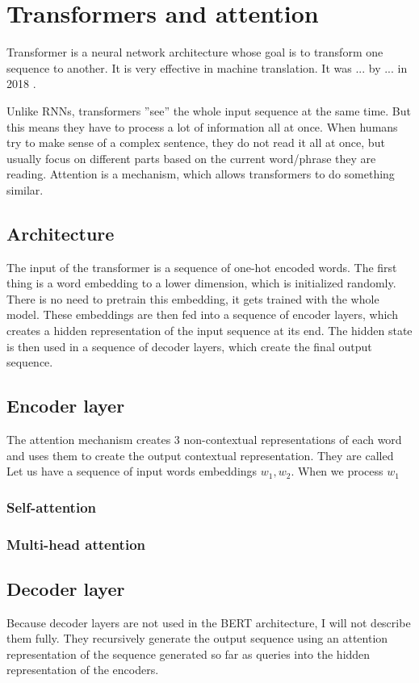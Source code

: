 \documentclass[
  digital, %
  table,   %
  twoside, %
  lof,     %
  lot,     %
]{fithesis3}
\begin{document}
\section{Transformers and attention}
Transformer is a neural network architecture whose goal is to transform one sequence to another. It is very effective in machine translation. It was ... by  ... in 2018 \cite{attentionisall}.

Unlike RNNs, transformers ''see'' the whole input sequence at the same time. But this means they have to process a lot of information all at once. When humans try to make sense of a complex sentence, they do not read it all at once, but usually focus on different parts based on the current word/phrase they are reading. Attention is a mechanism, which allows transformers to do something similar.

\subsection{Architecture}

The input of the transformer is a sequence of one-hot encoded words. The first thing is a word embedding to a lower dimension, which is initialized randomly. There is no need to pretrain this embedding, it gets trained with the whole model. 
These embeddings are then fed into a sequence of encoder layers, which creates a hidden representation of the input sequence at its end. The hidden state is then used in a sequence of decoder layers, which create the final output sequence.

\subsection{Encoder layer}
The attention mechanism creates 3 non-contextual representations of each word and uses them to create the output contextual representation. They are called
Let us have a sequence of input words embeddings $w_1, w_2$. When we process $w_1$ 

\subsubsection{Self-attention}


\subsubsection{Multi-head attention}
\subsection{Decoder layer}
Because decoder layers are not used in the BERT architecture, I will not describe them fully. They recursively generate the output sequence using an attention representation of the sequence generated so far as queries into the hidden representation of the encoders.
\end{document}

